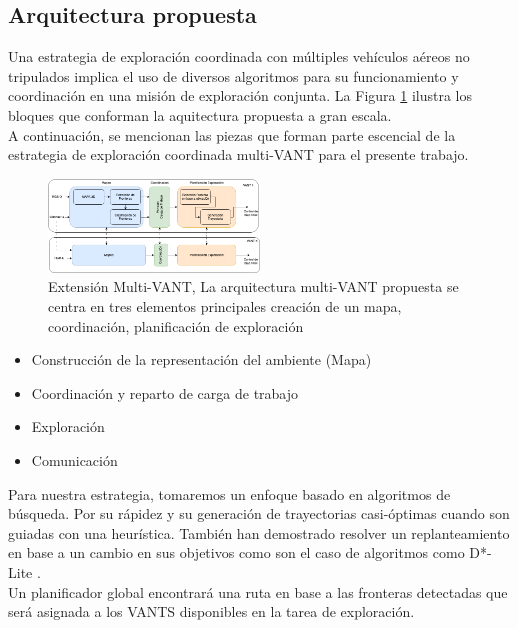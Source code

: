 \documentclass[sigconf]{acmart}
\begin{document}
\subsection*{Arquitectura propuesta}

Una estrategia de exploración coordinada con múltiples vehículos aéreos no tripulados implica el uso de diversos algoritmos para su funcionamiento y coordinación en una misión de exploración conjunta. La Figura \ref{fig:multivant} ilustra los bloques que conforman la aquitectura propuesta a gran escala.\\

A continuación, se mencionan las piezas que forman parte escencial de la estrategia de exploración coordinada multi-VANT para el presente trabajo.

\begin{figure}[h]
\centering
\includegraphics[width=0.5\textwidth]{arqui_drone}
\caption{Extensión Multi-VANT, La arquitectura multi-VANT propuesta se centra en tres elementos principales creación de un mapa, coordinación, planificación de exploración}
\label{fig:multivant}
\end{figure}

\begin{itemize}
\item Construcción de la representación del ambiente (Mapa)
\item Coordinación y reparto de carga de trabajo
\item Exploración
\item Comunicación
\end{itemize}

Para nuestra estrategia, tomaremos un enfoque basado en algoritmos de búsqueda. Por su rápidez y su generación de trayectorias casi-óptimas cuando son guiadas con una heurística. También han demostrado resolver un replanteamiento en base a un cambio en sus objetivos como son el caso de algoritmos como D*-Lite \cite{D_estrella}.\\

Un planificador global encontrará una ruta en base a las fronteras detectadas que será asignada a los VANTS disponibles en la tarea de exploración.\\
\end{document}
